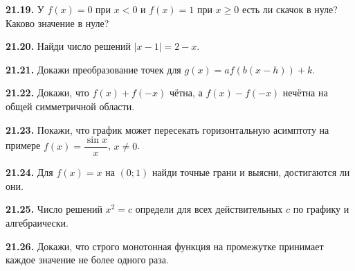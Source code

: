 \noindent\begin{minipage}[t]{\linewidth}\textbf{21.19.} У \(f(x)=0\) при \(x<0\) и \(f(x)=1\) при \(x\ge0\) есть ли скачок в нуле? Каково значение в нуле?\par\end{minipage}\par
\noindent\begin{minipage}[t]{\linewidth}\textbf{21.20.} Найди число решений \(|x-1|=2-x\).\par\end{minipage}\par
\noindent\begin{minipage}[t]{\linewidth}\textbf{21.21.}\starmark{} Докажи преобразование точек для \(g(x)=af(b(x-h))+k\).\par\end{minipage}\par
\noindent\begin{minipage}[t]{\linewidth}\textbf{21.22.}\starmark{} Докажи, что \(f(x)+f(-x)\) чётна, а \(f(x)-f(-x)\) нечётна на общей симметричной области.\par\end{minipage}\par
\noindent\begin{minipage}[t]{\linewidth}\textbf{21.23.}\starmark{} Покажи, что график может пересекать горизонтальную асимптоту на примере \(f(x)=\dfrac{\sin x}x\), \(x\ne0\).\par\end{minipage}\par
\noindent\begin{minipage}[t]{\linewidth}\textbf{21.24.} Для \(f(x)=x\) на \((0;1)\) найди точные грани и выясни, достигаются ли они.\par\end{minipage}\par
\noindent\begin{minipage}[t]{\linewidth}\textbf{21.25.} Число решений \(x^2=c\) определи для всех действительных \(c\) по графику и алгебраически.\par\end{minipage}\par
\noindent\begin{minipage}[t]{\linewidth}\textbf{21.26.}\starmark{} Докажи, что строго монотонная функция на промежутке принимает каждое значение не более одного раза.\par\end{minipage}\par
